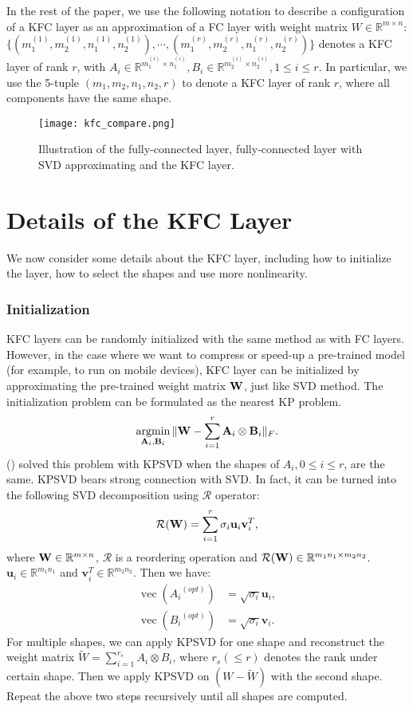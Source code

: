 \documentclass{article}
\def\A{{\bf A}}
\def\B{{\bf B}}
\def\W{{\bf W}}
\def\RB{{\mathbb R}}
\def\vect{\operatorname{vec}}
\DeclareMathOperator*{\argmin}{arg min}
\begin{document}
In the rest of the paper, we use the following notation to describe a configuration of a KFC layer as an approximation of
a FC layer with weight matrix $W \in \mathbb{R}^{m\times n}$: $ \{ (m_1^{(1)},m_2^{(1)}, n_1^{(1)}, n_2^{(1)}),\cdots ,(m_1^{(r)},m_2^{(r)},
n_1^{(r)},n_2^{(r)}) \}$ denotes a KFC layer of rank $r$,
with $ A_i \in \mathbb{R}^{m_1^{(i)}\times n_1^{(i)}}, B_i\in \mathbb{R}^{m_2^{(i)} \times n_2^{(i)}}, 1\le i \le r$.
In particular, we use the 5-tuple $ (m_1, m_2, n_1, n_2, r)$ to denote a KFC layer of rank $r$, where all components have the same shape.
\begin{figure}
\centering
\texttt{[image: kfc\_compare.png]}
\caption{Illustration of the fully-connected layer, fully-connected layer with SVD approximating and the KFC layer.}
\label{fig:kfc_compare}
\end{figure}

\section{Details of the KFC Layer}
We now consider some details about the KFC layer, including how to initialize the layer, how to select the shapes and use more nonlinearity.

\subsubsection{Initialization}
KFC layers can be randomly initialized with the same method as with FC layers. However, in the case where we want to compress or speed-up a pre-trained model (for example, to run on mobile devices),
KFC layer can be initialized by approximating the pre-trained weight matrix $\W$, just like SVD method. The initialization problem can be formulated as the nearest KP problem.
\begin{align}
\argmin_{\A_i, \B_i} \|\W - \sum_{i=1}^{r}\A_i \otimes \B_i\|_F.
\end{align}
\citeauthor{van1993approximation}  (\citeyear{van1993approximation}) solved this problem with KPSVD when the shapes of $A_i, 0\leq i \leq r$, are the same. KPSVD bears strong connection with SVD. In fact, it can be turned into the following SVD decomposition using $\mathcal{R}$  operator:
\begin{align}
  \mathcal{R}(\W) = \sum_{i=1}^{r}\sigma_i \mathbf{u}_i \mathbf{v}_i^T,
\end{align}
where $\W\in \RB^{m\times n}$, $\mathcal{R}$ is a reordering operation and $\mathcal{R}(\W) \in \RB^{m_1n_1 \times m_2n_2}$.
$\mathbf{u}_i \in \RB^{m_1n_1}$ and $\mathbf{v}_i^T \in \RB^{m_2n_2}$. Then we have:
\begin{align}
  \vect\left({A_i}^{(opt)}\right) &= \sqrt{\sigma_i}\mathbf{u}_i, \\
  \vect\left({B_i}^{(opt)}\right) &= \sqrt{\sigma_i}\mathbf{v}_i.
\end{align}
For multiple shapes, we can apply KPSVD for one shape and reconstruct the weight matrix
$\tilde{W} = \sum_{i=1}^{r_s}A_i\otimes B_i$, where $r_s (\leq r)$ denotes the rank under certain shape. Then we apply KPSVD on $(W-\tilde{W})$ with the second shape. Repeat the above two steps recursively until all shapes are computed.
\end{document}
